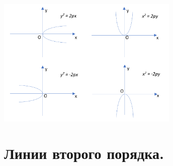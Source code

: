 \documentclass[a4paper, 12pt]{report}
\begin{document}
\begin{center}
	\includegraphics[width=0.65\textwidth]{Парабола_2.PNG}
\end{center}






\section{Линии второго порядка.}
\end{document}
